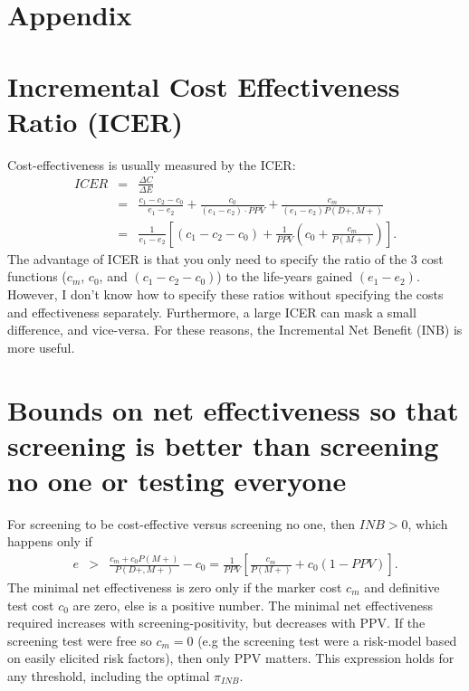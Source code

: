 \documentclass[11pt]{article}
\begin{document}
\appendix 
\section*{Appendix}
\label{Appendix}

\section*{Incremental Cost Effectiveness Ratio (ICER)}
\label{sec:ICER}

Cost-effectiveness is usually measured by the ICER:
\begin{eqnarray} 
 ICER &=& \frac{\Delta C}{\Delta E}\\ \nonumber
      &=& \frac{c_1-c_2-c_0}{e_1-e_2} + \frac{c_0}{(e_1-e_2)\cdot PPV} + \frac{c_m}{(e_1-e_2)P(D+,M+)}\\ \nonumber
      &=& \frac{1}{e_1-e_2}\left[ (c_1-c_2-c_0) + \frac{1}{PPV} \left( c_0 + \frac{c_m}{P(M+)} \right) \right]. \label{eq:ICER}
\end{eqnarray}
The advantage of ICER is that you only need to specify the ratio of the 3 cost functions ($c_m$, $c_0$, and $(c_1-c_2-c_0)$) to the life-years gained $(e_1-e_2)$.  However, I don't know how to specify these ratios without specifying the costs and effectiveness separately.  Furthermore, a large ICER can mask a small difference, and vice-versa.  For these reasons, the Incremental Net Benefit (INB) is more useful.

\section*{Bounds on net effectiveness so that screening is better than screening no one or testing everyone}
\label{sec:BoundsOnNetEffectiveness}

For screening to be cost-effective versus screening no one, then $INB>0$, which happens only if
\begin{eqnarray*}
  e &>& \frac{c_m+c_0P(M+)}{P(D+,M+)} - c_0 = \frac{1}{PPV}\left[\frac{c_m}{P(M+)}+c_0(1-PPV)\right]. 
\end{eqnarray*}
The minimal net effectiveness is zero only if the marker cost $c_m$ and definitive test cost $c_0$ are zero, else is a positive number.  The minimal net effectiveness required increases with screening-positivity, but decreases with PPV.  If the screening test were free so $c_m=0$ (e.g the screening test were a risk-model based on easily elicited risk factors), then only PPV matters.  This expression holds for any threshold, including the optimal $\pi_{INB}$.
\end{document}
